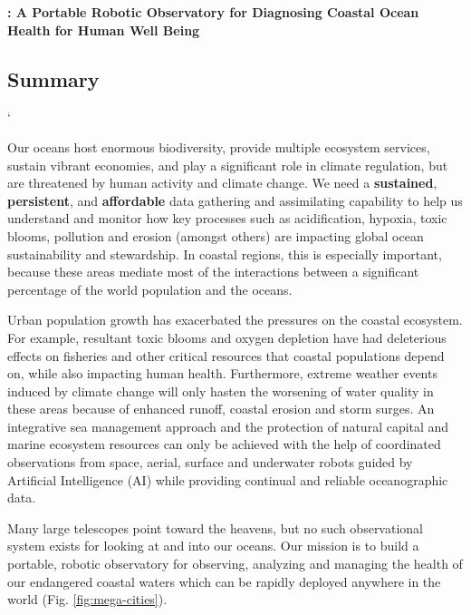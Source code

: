 \documentclass[12pt]{article}
\begin{document}
\vspace*{1cm}
\begin{center}
  {\large \bf{\proe}: A Portable Robotic Observatory for Diagnosing Coastal Ocean Health for Human Well Being}\\
\end{center}

\vspace*{0.5cm}




\subsection{Summary}
`

Our oceans host enormous biodiversity, provide multiple ecosystem
services, sustain vibrant economies, and play a significant role in
climate regulation, but are threatened by human activity and climate
change.  We need a \textbf{sustained}, \textbf{persistent}, and
\textbf{affordable} data gathering and assimilating capability to help
us understand and monitor how key processes such as acidification,
hypoxia, toxic blooms, pollution and erosion (amongst others) are
impacting global ocean sustainability and stewardship.  In coastal
regions, this is especially important, because these areas mediate
most of the interactions between a significant percentage of the world
population and the oceans.

Urban population growth has exacerbated the pressures on the coastal
ecosystem.  For example, resultant toxic blooms and oxygen depletion
have had deleterious effects on fisheries and other critical resources
that coastal populations depend on, while also impacting human
health. Furthermore, extreme weather events induced by climate change
will only hasten the worsening of water quality in these areas because
of enhanced runoff, coastal erosion and storm surges. An integrative
sea management approach and the protection of natural capital and
marine ecosystem resources can only be achieved with the help of
coordinated observations from space, aerial, surface and underwater
robots guided by Artificial Intelligence (AI) while providing
continual and reliable oceanographic data.

Many large telescopes point toward the heavens, but no such
observational system exists for looking at and into our oceans.  Our
mission is to build a portable, robotic observatory for observing,
analyzing and managing the health of our endangered coastal waters
which can be rapidly deployed anywhere in the world
(Fig. \ref{fig:mega-cities}).
\end{document}
